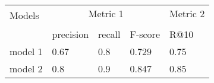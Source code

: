 \begin{tabular}{lllll}
    \toprule
    \multirow{2}{*}{Models} & \multicolumn{3}{c}{Metric 1} & Metric 2\\
    \cmidrule{2-4} \cmidrule{5-5} \\
    {} & precision & recall & F-score  & R@10 \\
    \midrule
    model 1 & 0.67  & 0.8 & 0.729  & 0.75 \\
    model 2 & 0.8 & 0.9 & 0.847 & 0.85 \\
    \bottomrule
\end{tabular}
